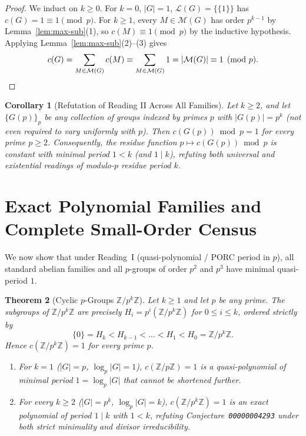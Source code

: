 \documentclass[11pt,a4paper]{article}
\newtheorem{theorem}{Theorem}[section]
\newtheorem{corollary}[theorem]{Corollary}
\theoremstyle{definition}
\begin{document}
\begin{proof}
We induct on $k \ge 0$. For $k = 0$, $|G| = 1$, $\mathcal{L}(G) = \{\{1\}\}$ has $c(G) = 1 \equiv 1 \pmod p$. For $k \ge 1$, every $M \in \mathcal{M}(G)$ has order $p^{k-1}$ by Lemma~\ref{lem:max-sub}(1), so $c(M) \equiv 1 \pmod p$ by the inductive hypothesis. Applying Lemma~\ref{lem:max-sub}(2)--(3) gives
\[
  c(G) = \sum_{M \in \mathcal{M}(G)} c(M) \equiv \sum_{M \in \mathcal{M}(G)} 1 = |\mathcal{M}(G)| \equiv 1 \pmod p. \qedhere
\]
\end{proof}

\begin{corollary}[Refutation of Reading II Across All Families]\label{cor:mod-p-refute}
Let $k \ge 2$, and let $\{G(p)\}_p$ be \emph{any} collection of groups indexed by primes $p$ with $|G(p)| = p^k$ (not even required to vary uniformly with $p$). Then $c(G(p)) \bmod p = 1$ for every prime $p \ge 2$. Consequently, the residue function $p \mapsto c(G(p)) \bmod p$ is constant with minimal period $1 < k$ (and $1 \mid k$), refuting both universal and existential readings of modulo-$p$ residue period $k$.
\end{corollary}

\section{Exact Polynomial Families and Complete Small-Order Census}

We now show that under Reading~I (quasi-polynomial / PORC period in $p$), all standard abelian families and all $p$-groups of order $p^2$ and $p^3$ have minimal quasi-period $1$.

\begin{theorem}[Cyclic $p$-Groups $\mathbb{Z}/p^k\mathbb{Z}$]\label{thm:cyclic}
Let $k \ge 1$ and let $p$ be any prime. The subgroups of $\mathbb{Z}/p^k\mathbb{Z}$ are precisely $H_i = p^i(\mathbb{Z}/p^k\mathbb{Z})$ for $0 \le i \le k$, ordered strictly by
\[
  \{0\} = H_k < H_{k-1} < \dots < H_1 < H_0 = \mathbb{Z}/p^k\mathbb{Z}.
\]
Hence $c(\mathbb{Z}/p^k\mathbb{Z}) = 1$ for every prime $p$.
\begin{enumerate}
  \item For $k = 1$ ($|G| = p$, $\log_p |G| = 1$), $c(\mathbb{Z}/p\mathbb{Z}) = 1$ is a quasi-polynomial of minimal period $1 = \log_p |G|$ that cannot be shortened further.
  \item For every $k \ge 2$ ($|G| = p^k$, $\log_p |G| = k$), $c(\mathbb{Z}/p^k\mathbb{Z}) = 1$ is an exact polynomial of period $1 \mid k$ with $1 < k$, refuting Conjecture~\texttt{00000004293} under both strict minimality and divisor irreducibility.
\end{enumerate}
\end{theorem}
\end{document}

